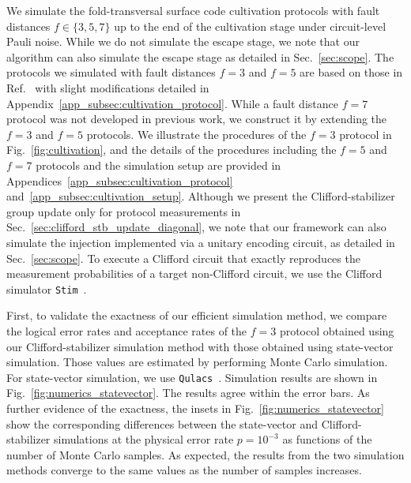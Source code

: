 \documentclass[
 reprint,
 amsmath,amssymb,
 pra,superscriptaddress, nofootinbib
]{revtex4-2}
\theoremstyle{definition}
\theoremstyle{plain}
\begin{document}
We simulate the fold-transversal surface code cultivation protocols with fault distances $f\in \{3, 5, 7\}$ up to the end of the cultivation stage under circuit-level Pauli noise.  While we do not simulate the escape stage, we note that our algorithm can also simulate the escape stage as detailed in Sec.~\ref{sec:scope}.
The protocols we simulated with fault distances $f=3$ and $f=5$ are based on those in Ref.~\cite{gpvl-lg4c} with slight modifications detailed in Appendix~\ref{app_subsec:cultivation_protocol}. 
While a fault distance $f=7$ protocol was not developed in previous work, we construct it by extending the $f=3$ and $f=5$ protocols.
We illustrate the procedures of the $f=3$ protocol in Fig.~\ref{fig:cultivation}, and the details of the procedures including the $f=5$ and $f=7$ protocols and the simulation setup are provided in Appendices~\ref{app_subsec:cultivation_protocol} and~\ref{app_subsec:cultivation_setup}.
Although we present the Clifford-stabilizer group update only for protocol measurements in Sec.~\ref{sec:clifford_stb_update_diagonal}, we note that our framework can also simulate the injection implemented via a unitary encoding circuit, as detailed in Sec.~\ref{sec:scope}.
To execute a Clifford circuit that exactly reproduces the measurement probabilities of a target non-Clifford circuit, we use the Clifford simulator \texttt{Stim}~\cite{Gidney2021stimfaststabilizer}. 

First, to validate the exactness of our efficient simulation method, we compare the logical error rates and acceptance rates of the $f=3$ protocol obtained using our Clifford-stabilizer simulation method with those obtained using state-vector simulation.
Those values are estimated by performing Monte Carlo simulation.
For state-vector simulation, we use \texttt{Qulacs}~\cite{Suzuki2021qulacsfast}.
Simulation results are shown in Fig.~\ref{fig:numerics_statevector}.  
The results agree within the error bars.
As further evidence of the exactness, the insets in Fig.~\ref{fig:numerics_statevector} show the corresponding differences between the state-vector and Clifford-stabilizer simulations at the physical error rate $p=10^{-3}$ as functions of the number of Monte Carlo samples. 
As expected, the results from the two simulation methods converge to the same values as the number of samples increases.
\end{document}
